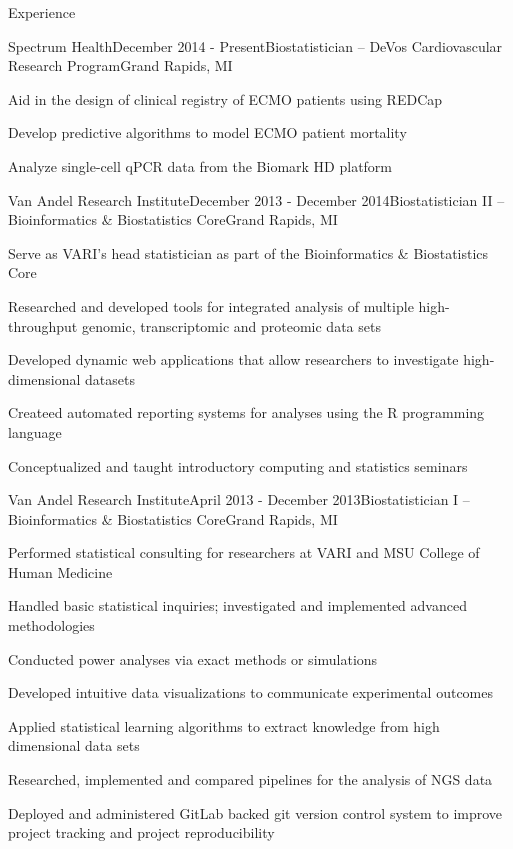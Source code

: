 \documentclass{resume} %
\begin{document}
\begin{rSection}{Experience}

\begin{rSubsection}{Spectrum Health}{December 2014 - Present}{Biostatistician -- DeVos Cardiovascular Research Program}{Grand Rapids, MI}
\item Aid in the design of clinical registry of ECMO patients using REDCap
\item Develop predictive algorithms to model ECMO patient mortality
\item Analyze single-cell qPCR data from the Biomark HD platform 
\end{rSubsection}


\begin{rSubsection}{Van Andel Research Institute}{December 2013 - December 2014}{Biostatistician II -- Bioinformatics \& Biostatistics Core}{Grand Rapids, MI}
\item Serve as VARI's head statistician as part of the Bioinformatics \& Biostatistics Core 
\item Researched and developed tools for integrated analysis of multiple high-throughput genomic, transcriptomic and proteomic data sets
\item Developed dynamic web applications that allow researchers to investigate high-dimensional datasets
\item Createed automated reporting systems for analyses using the R programming language
\item Conceptualized and taught introductory computing and statistics seminars
\end{rSubsection}


\begin{rSubsection}{Van Andel Research Institute}{April 2013 - December 2013}{Biostatistician I -- Bioinformatics \& Biostatistics Core}{Grand Rapids, MI}
\item Performed statistical consulting for researchers at VARI and MSU College of Human Medicine
\item Handled basic statistical inquiries; investigated and implemented advanced methodologies 
\item Conducted power analyses via exact methods or simulations
\item Developed intuitive data visualizations to communicate experimental outcomes
\item Applied statistical learning algorithms to extract knowledge from high dimensional data sets
\item Researched, implemented and compared pipelines for the analysis of NGS data
\item Deployed and administered GitLab backed git version control system to improve project tracking and project reproducibility
\end{rSubsection}


\end{rSection}
\end{document}
